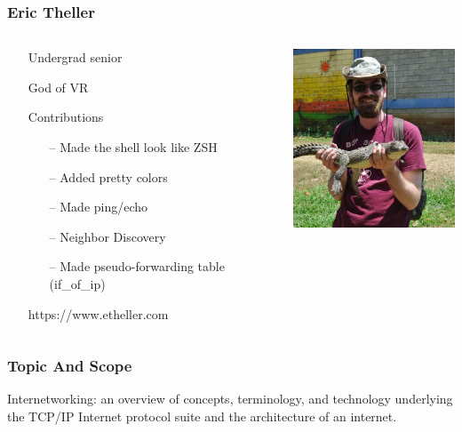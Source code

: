 \documentclass[professionalfonts, t, aspectratio=1610]{beamer}
\begin{document}
\renewcommand{\baselinestretch}{1.3}
\begin{frame} 
\frametitle{Eric Theller}
\bigskip
\begin{minipage}[0.2\textheight]{\textwidth}
\begin{columns}[T]
\begin{column}{0.6\textwidth}
\begin{itemize}
\item[\textbullet] Undergrad senior
\item[\textbullet] God of VR
\item[\textbullet] Contributions
  \begin{itemize}
    \item[--] Made the shell look like ZSH
    \item[--] Added pretty colors
    \item[--] Made ping/echo
    \item[--] Neighbor Discovery
    \item[--] Made pseudo-forwarding table (if\_of\_ip)
  \end{itemize}
\item[\textbullet] https://www.etheller.com
\end{itemize}
\end{column}
\begin{column}{0.4\textwidth}
\includegraphics[width=5cm]{eric.jpg}
\end{column}
\end{columns}
\end{minipage}
\end{frame}

\renewcommand{\baselinestretch}{1.3}
\begin{frame} 
\frametitle{Topic And Scope} 
\bigskip
\bigskip
\bigskip
Internetworking: an overview of concepts, terminology, and technology underlying the TCP/IP Internet protocol suite and the architecture of an internet.
\end{frame}
\end{document}

